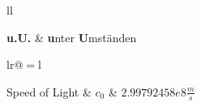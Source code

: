 \documentclass[
10pt, %
twoside, %
chapterinoneline,%
onehalfspacing, %
nolistspacing, %
parskip, %
headsepline, %
english,
]{MastersDoctoralThesis} %
\begin{document}


\begin{abbreviations}{ll} %
	
	
	\textbf{u.U.} & \textbf{u}nter \textbf{U}mständen\\
	
\end{abbreviations}


\begin{constants}{lr@{${}={}$}l} %
	
	
	Speed of Light & $c_{0}$ & $\unit{2.99792458e8}{\frac{m}{s}}$\\

	
\end{constants}


\mainmatter%

\pagestyle{thesis} %



%


\appendix %





\printbibliography[heading=bibintoc]


\end{document}
